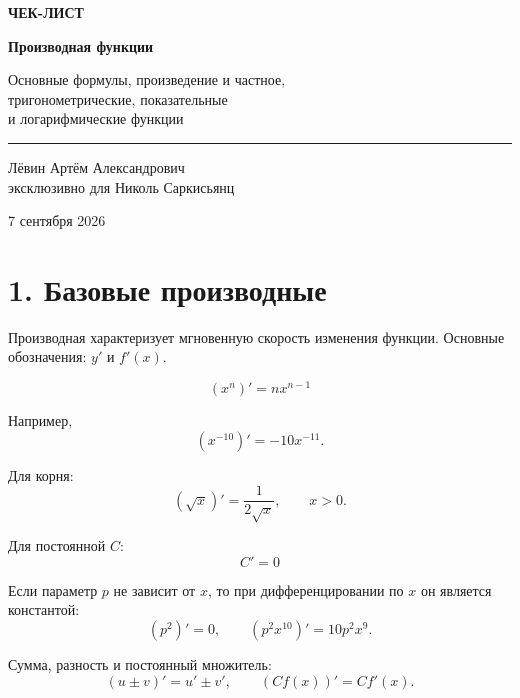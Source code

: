 \documentclass[a4paper,12pt]{article}
\newcommand{\sectionline}{\vspace{0.25em}{\color{accent}\rule{\linewidth}{0.8pt}}\vspace{0.45em}}
\newcommand{\keyformula}[1]{\[\boxed{\displaystyle #1}\]}
\begin{document}
\begin{titlepage}
\thispagestyle{empty}
\begin{center}
\vspace*{2.2cm}
{\color{darkaccent}\Large\bfseries ЧЕК-ЛИСТ}
\vspace{0.8cm}

{\Huge\bfseries Производная функции}
\vspace{0.45cm}

{\Large Основные формулы, произведение и частное,\\
тригонометрические, показательные\\
и логарифмические функции}
\vspace{1.6cm}

{\color{accent}\rule{0.62\linewidth}{1pt}}
\vfill

{\large Лёвин Артём Александрович\\[0.35em]
эксклюзивно для Николь Саркисьянц}
\vspace{0.65cm}

{\large 7 сентября 2026}
\vspace{1.8cm}
\end{center}
\end{titlepage}

\section*{\color{darkaccent}1. Базовые производные}
\sectionline

Производная характеризует мгновенную скорость изменения функции. Основные обозначения: $y'$ и $f'(x)$.

\keyformula{(x^n)'=nx^{n-1}}

Например,
\[
(x^{-10})'=-10x^{-11}.
\]

Для корня:
\[
(\sqrt{x})'=\frac{1}{2\sqrt{x}},\qquad x>0.
\]

Для постоянной $C$:
\keyformula{C'=0}

Если параметр $p$ не зависит от $x$, то при дифференцировании по $x$ он является константой:
\[
(p^2)'=0,\qquad (p^2x^{10})'=10p^2x^9.
\]

Сумма, разность и постоянный множитель:
\[
(u\pm v)'=u'\pm v',\qquad (C f(x))'=C f'(x).
\]
\end{document}
